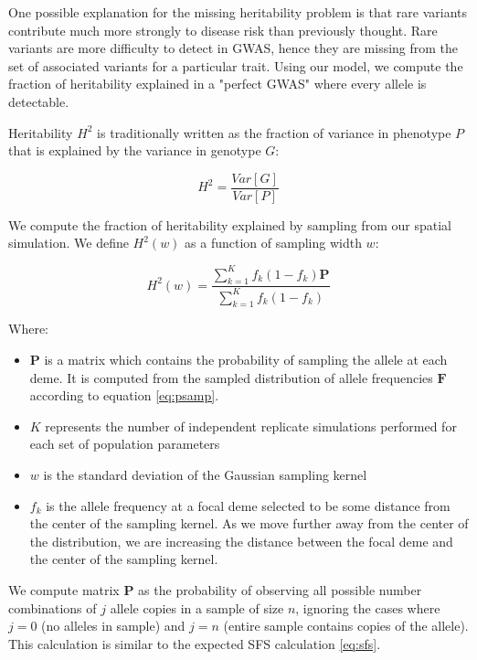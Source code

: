 One possible explanation for the missing heritability problem is that rare variants contribute much more strongly to disease risk than previously thought. Rare variants are more difficulty to detect in GWAS, hence they are missing from the set of associated variants for a particular trait. Using our model, we compute the fraction of heritability explained in a "perfect GWAS" where every allele is detectable. 

Heritability $H^2$ is traditionally written as the fraction of variance in phenotype $P$ that is explained by the variance in genotype $G$:


\begin{equation}
    H^2 = \frac{Var[G]}{Var[P]}
\end{equation}


We compute the fraction of heritability explained by sampling from our spatial simulation. We define $H^2(w)$ as a function of sampling width $w$:

\begin{equation}
    H^2(w) = \frac{\sum_{k=1}^{K} f_k(1-f_k) \textbf{P}}{\sum_{k=1}^{K} f_k(1-f_k)}
\end{equation}

Where:
\begin{itemize}
    \item $\textbf{P}$ is a matrix which contains the probability of sampling the allele at each deme. It is computed from the sampled distribution of allele frequencies $\textbf{F}$ according to equation \ref{eq:psamp}.
    \item $K$ represents the number of independent replicate simulations performed for each set of population parameters
    \item $w$ is the standard deviation of the Gaussian sampling kernel
    \item $f_k$ is the allele frequency at a focal deme selected to be some distance from the center of the sampling kernel. As we move further away from the center of the distribution, we are increasing the distance between the focal deme and the center of the sampling kernel.
\end{itemize}

We compute matrix $\textbf{P}$ as the probability of observing all possible number combinations of $j$ allele copies in a sample of size $n$, ignoring the cases where $j = 0$ (no alleles in sample) and $j = n$ (entire sample contains copies of the allele). This calculation is similar to the expected SFS calculation \ref{eq:sfs}. 

